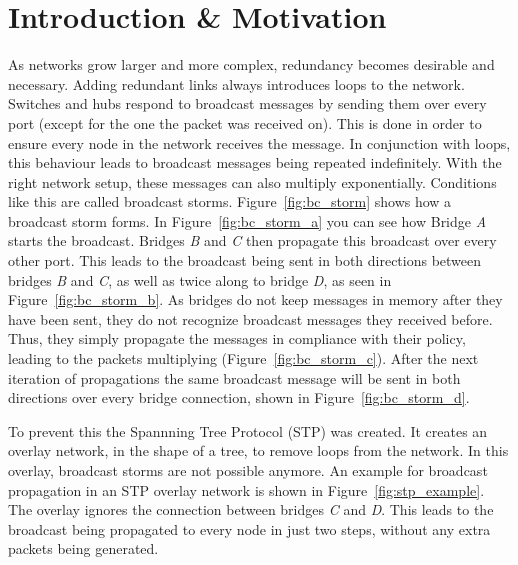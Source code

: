 \chapter{Introduction \& Motivation}
\label{introduction}
As networks grow larger and more complex, redundancy becomes desirable and necessary.
Adding redundant links always introduces loops to the network.
Switches and hubs respond to broadcast messages by sending them over every port (except for the one the packet was received on).
This is done in order to ensure every node in the network receives the message.
In conjunction with loops, this behaviour leads to broadcast messages being repeated indefinitely.
With the right network setup, these messages can also multiply exponentially. 
Conditions like this are called broadcast storms\cite{bstorm}.
Figure~\ref{fig:bc_storm} shows how a broadcast storm forms.
In Figure~\ref{fig:bc_storm_a} you can see how Bridge \textit{A} starts the broadcast.
Bridges \textit{B} and \textit{C} then propagate this broadcast over every other port.
This leads to the broadcast being sent in both directions between bridges \textit{B} and \textit{C}, as well as twice along to bridge \textit{D}, as seen in Figure~\ref{fig:bc_storm_b}.
As bridges do not keep messages in memory after they have been sent, they do not recognize broadcast messages they received before.
Thus, they simply propagate the messages in compliance with their policy, leading to the packets multiplying (Figure~\ref{fig:bc_storm_c}).
After the next iteration of propagations the same broadcast message will be sent in both directions over every bridge connection, shown in Figure~\ref{fig:bc_storm_d}.

To prevent this the Spannning Tree Protocol (STP)\cite{perlman85} was created.
It creates an overlay network, in the shape of a tree, to remove loops from the network.
In this overlay, broadcast storms are not possible anymore.
An example for broadcast propagation in an STP overlay network is shown in Figure~\ref{fig:stp_example}.
The overlay ignores the connection between bridges \textit{C} and \textit{D}.
This leads to the broadcast being propagated to every node in just two steps, without any extra packets being generated.

